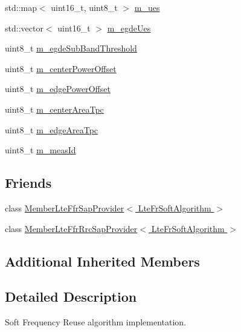 \begin{DoxyCompactItemize}
\item 
std\+::map$<$ uint16\+\_\+t, uint8\+\_\+t $>$ \hyperlink{classns3_1_1LteFrSoftAlgorithm_a571117042ed967faa798f96b0200e84e}{m\+\_\+ues}
\item 
std\+::vector$<$ uint16\+\_\+t $>$ \hyperlink{classns3_1_1LteFrSoftAlgorithm_a02ad791cd3062806b721d7eb201a8766}{m\+\_\+egde\+Ues}
\item 
uint8\+\_\+t \hyperlink{classns3_1_1LteFrSoftAlgorithm_ab06a0ac550999e2144a3169ad8879914}{m\+\_\+egde\+Sub\+Band\+Threshold}
\item 
uint8\+\_\+t \hyperlink{classns3_1_1LteFrSoftAlgorithm_a0218007e3441b896368aa4c733ac01fe}{m\+\_\+center\+Power\+Offset}
\item 
uint8\+\_\+t \hyperlink{classns3_1_1LteFrSoftAlgorithm_a7dcc64418f28e1120ce4572318138d14}{m\+\_\+edge\+Power\+Offset}
\item 
uint8\+\_\+t \hyperlink{classns3_1_1LteFrSoftAlgorithm_a5e508c0c0a988db791c4488f822c8aa4}{m\+\_\+center\+Area\+Tpc}
\item 
uint8\+\_\+t \hyperlink{classns3_1_1LteFrSoftAlgorithm_a10741f1e92877b05db224b19c79f4782}{m\+\_\+edge\+Area\+Tpc}
\item 
uint8\+\_\+t \hyperlink{classns3_1_1LteFrSoftAlgorithm_acc3523f48f9fa0fcdec80850c1c13568}{m\+\_\+meas\+Id}
\end{DoxyCompactItemize}
\subsection*{Friends}
\begin{DoxyCompactItemize}
\item 
class \hyperlink{classns3_1_1LteFrSoftAlgorithm_a32f74da711d34d857efcf85cd800dca9}{Member\+Lte\+Ffr\+Sap\+Provider$<$ Lte\+Fr\+Soft\+Algorithm $>$}
\item 
class \hyperlink{classns3_1_1LteFrSoftAlgorithm_a59bf8dbab0d83bc575d73ad524cfacb7}{Member\+Lte\+Ffr\+Rrc\+Sap\+Provider$<$ Lte\+Fr\+Soft\+Algorithm $>$}
\end{DoxyCompactItemize}
\subsection*{Additional Inherited Members}


\subsection{Detailed Description}
Soft Frequency Reuse algorithm implementation. 

